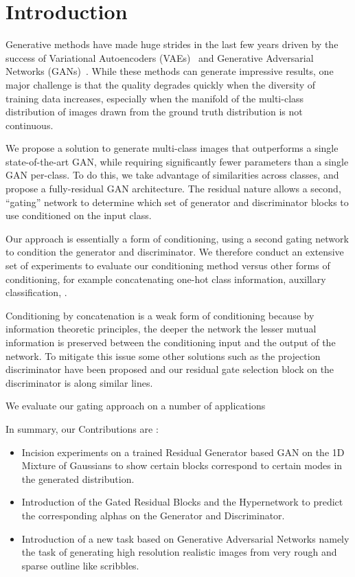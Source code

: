 \section{Introduction}
Generative methods have made huge strides in the last few years driven by the success of Variational Autoencoders (VAEs)~\cite{kingma2013auto} and Generative Adversarial Networks (GANs)~\cite{goodfellow2014generative}. 
While these methods can generate impressive results, one major challenge is that the quality degrades quickly when the diversity of training data increases, especially when the manifold of the multi-class distribution of images drawn from the ground truth distribution is not continuous. 

We propose a solution to generate multi-class images that outperforms a single state-of-the-art GAN, while requiring significantly fewer parameters than a single GAN per-class. 
To do this, we take advantage of similarities across classes, and propose a fully-residual GAN architecture. 
The residual nature allows a second, ``gating'' network to determine which set of generator and discriminator blocks to use conditioned on the input class. 


Our approach is essentially a form of conditioning, using a second gating network to condition the generator and discriminator. 
We therefore conduct an extensive set of experiments to evaluate our conditioning method versus other forms of conditioning, for example concatenating one-hot class information, auxillary classification, .

Conditioning by concatenation is a weak form of conditioning because by information theoretic principles, the deeper the network the lesser mutual information is preserved between the conditioning input and the output of the network. To mitigate this issue some other solutions such as the projection discriminator \cite{miyato2018cgans} have been proposed and our residual gate selection block on the discriminator is along similar lines. 

We evaluate our gating approach on a number of applications 

In summary, our Contributions are :
\begin{itemize}
\item Incision experiments on a trained Residual Generator based GAN on the 1D Mixture of Gaussians to show certain blocks correspond to certain modes in the generated distribution.
\item Introduction of the Gated Residual Blocks and the Hypernetwork to predict the corresponding alphas on the Generator and Discriminator.
\item Introduction of a new task based on Generative Adversarial Networks namely the task of generating high resolution realistic images from very rough and sparse outline like scribbles.
\end{itemize}